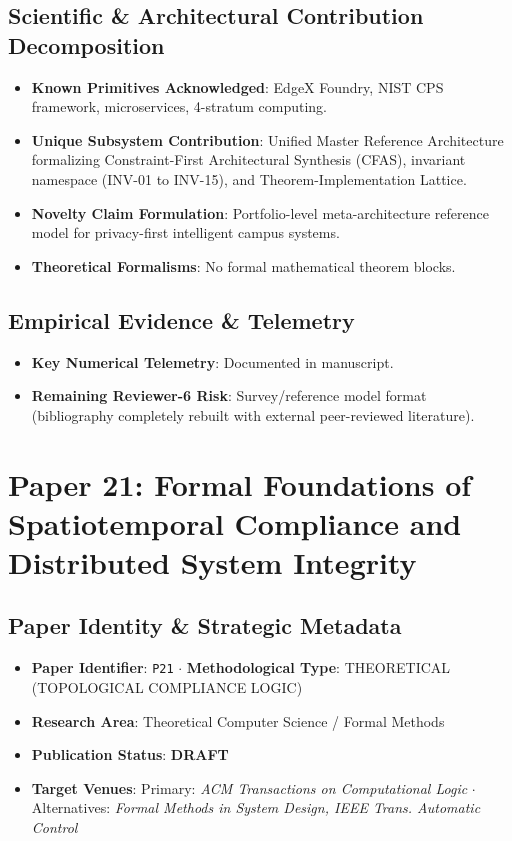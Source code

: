 \documentclass[11pt,a4paper]{article}
\begin{document}
\subsection*{Scientific & Architectural Contribution Decomposition}
\begin{itemize}[leftmargin=1.5em, itemsep=0.2em]
    \item \textbf{Known Primitives Acknowledged}: EdgeX Foundry, NIST CPS framework, microservices, 4-stratum computing.
    \item \textbf{Unique Subsystem Contribution}: Unified Master Reference Architecture formalizing Constraint-First Architectural Synthesis (CFAS), invariant namespace (INV-01 to INV-15), and Theorem-Implementation Lattice.
    \item \textbf{Novelty Claim Formulation}: Portfolio-level meta-architecture reference model for privacy-first intelligent campus systems.
    \item \textbf{Theoretical Formalisms}: No formal mathematical theorem blocks.
\end{itemize}

\subsection*{Empirical Evidence & Telemetry}
\begin{itemize}[leftmargin=1.5em, itemsep=0.2em]
    \item \textbf{Key Numerical Telemetry}: Documented in manuscript.
    \item \textbf{Remaining Reviewer-6 Risk}: Survey/reference model format (bibliography completely rebuilt with external peer-reviewed literature).
\end{itemize}

\section{Paper 21: Formal Foundations of Spatiotemporal Compliance and Distributed System Integrity}

\subsection*{Paper Identity \& Strategic Metadata}
\begin{itemize}[leftmargin=1.5em, itemsep=0.2em]
    \item \textbf{Paper Identifier}: \texttt{P21} $\cdot$ \textbf{Methodological Type}: THEORETICAL (TOPOLOGICAL COMPLIANCE LOGIC)
    \item \textbf{Research Area}: Theoretical Computer Science / Formal Methods
    \item \textbf{Publication Status}: \textbf{DRAFT}
    \item \textbf{Target Venues}: Primary: \textit{ACM Transactions on Computational Logic} $\cdot$ Alternatives: \textit{Formal Methods in System Design, IEEE Trans. Automatic Control}
\end{itemize}
\end{document}
